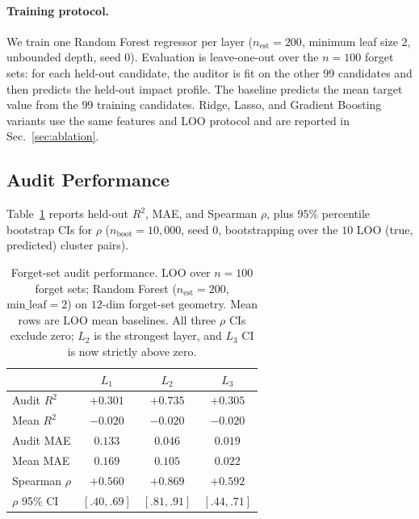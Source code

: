 \documentclass[11pt,a4paper]{article}
\newcommand{\Lone}{L_1}
\newcommand{\Ltwo}{L_2}
\newcommand{\Lthree}{L_3}
\begin{document}
\paragraph{Training protocol.} We train one Random Forest regressor per layer
($n_{\text{est}}{=}200$, minimum leaf size $2$, unbounded depth, seed $0$).
Evaluation is leave-one-out over the $n{=}100$ forget sets: for each held-out
candidate, the auditor is fit on the other $99$ candidates and then predicts
the held-out impact profile. The baseline predicts the mean target value from
the $99$ training candidates. Ridge, Lasso, and Gradient Boosting variants use
the same features and LOO protocol and are reported in Sec.~\ref{sec:ablation}.

\subsection{Audit Performance}
\label{sec:audit-perf}

Table~\ref{tab:audit} reports held-out $R^2$, MAE, and Spearman $\rho$, plus $95\%$ percentile bootstrap CIs for $\rho$ ($n_{\text{boot}}{=}10{,}000$, seed $0$, bootstrapping over the $10$ LOO (true, predicted) cluster pairs).

\begin{table}[t]
\centering
\footnotesize
\setlength{\tabcolsep}{2.2pt}
\begin{tabular}{@{}lccc@{}}
    \toprule
                         & $\Lone$            & $\Ltwo$            & $\Lthree$            \\
    \midrule
    Audit $R^2$          & $\mathbf{+0.301}$  & $\mathbf{+0.735}$  & $\mathbf{+0.305}$    \\
    Mean $R^2$           & $-0.020$           & $-0.020$           & $-0.020$             \\
    Audit MAE            & $\mathbf{0.133}$   & $\mathbf{0.046}$   & $\mathbf{0.019}$     \\
    Mean MAE             & $0.169$            & $0.105$            & $0.022$              \\
    \midrule
    Spearman $\rho$      & $+0.560$           & $+0.869$           & $+0.592$             \\
    $\rho$ 95\% CI       & $[.40,.69]$        & $[.81,.91]$        & $[.44,.71]$          \\
    \bottomrule
\end{tabular}
\caption{Forget-set audit performance. LOO over $n{=}100$ forget sets; Random Forest ($n_{\text{est}}{=}200$, $\text{min\_leaf}{=}2$) on $12$-dim forget-set geometry. Mean rows are LOO mean baselines. All three $\rho$ CIs exclude zero; $\Ltwo$ is the strongest layer, and $\Lthree$ CI is now strictly above zero.}
\label{tab:audit}
\end{table}
\end{document}
